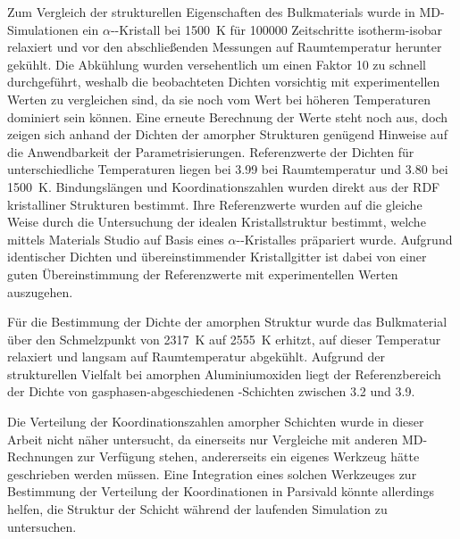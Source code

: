 Zum Vergleich der strukturellen Eigenschaften des Bulkmaterials wurde in MD-Simulationen ein $\alpha$--Kristall bei \SI{1500}{\kelvin} für \num{100000} Zeitschritte isotherm-isobar relaxiert und vor den abschließenden Messungen auf Raumtemperatur herunter gekühlt.
Die Abkühlung wurden versehentlich um einen Faktor 10 zu schnell durchgeführt, weshalb die beobachteten Dichten vorsichtig mit experimentellen Werten zu vergleichen sind, da sie noch vom Wert bei höheren Temperaturen dominiert sein können.
Eine erneute Berechnung der Werte steht noch aus, doch zeigen sich anhand der Dichten der amorpher Strukturen genügend Hinweise auf die Anwendbarkeit der Parametrisierungen.
Referenzwerte der Dichten für unterschiedliche Temperaturen liegen bei \SI{3.99}{\gpcc} bei Raumtemperatur und \SI{3.80}{\gpcc} bei \SI{1500}{\kelvin}\cite{fiquet_high-temperature_1999}.
Bindungslängen und Koordinationszahlen wurden direkt aus der RDF kristalliner Strukturen bestimmt.
Ihre Referenzwerte wurden auf die gleiche Weise durch die Untersuchung der idealen Kristallstruktur bestimmt, welche mittels Materials Studio\cite{biovia_materials_2014} auf Basis eines $\alpha$--Kristalles präpariert wurde.
Aufgrund identischer Dichten und übereinstimmender Kristallgitter\cite{haynes_crc_2011} ist dabei von einer guten Übereinstimmung der Referenzwerte mit experimentellen Werten auszugehen.

Für die Bestimmung der Dichte der amorphen Struktur wurde das Bulkmaterial über den Schmelzpunkt von \SI{2317}{\kelvin} auf \SI{2555}{\kelvin} erhitzt, auf dieser Temperatur relaxiert und langsam auf Raumtemperatur abgekühlt.
Aufgrund der strukturellen Vielfalt bei amorphen Aluminiumoxiden liegt der Referenzbereich der Dichte von gasphasen-abgeschiedenen -Schichten zwischen \SI{3.2}{\gpcc} und \SI{3.9}{\gpcc}\cite{wang_dependence_1997}.

Die Verteilung der Koordinationszahlen amorpher Schichten wurde in dieser Arbeit nicht näher untersucht, da einerseits nur Vergleiche mit anderen MD-Rechnungen zur Verfügung stehen\cite{gutierrez_molecular_2002}, andererseits ein eigenes Werkzeug hätte geschrieben werden müssen.
Eine Integration eines solchen Werkzeuges zur Bestimmung der Verteilung der Koordinationen in Parsivald könnte allerdings helfen, die Struktur der Schicht während der laufenden Simulation zu untersuchen.

